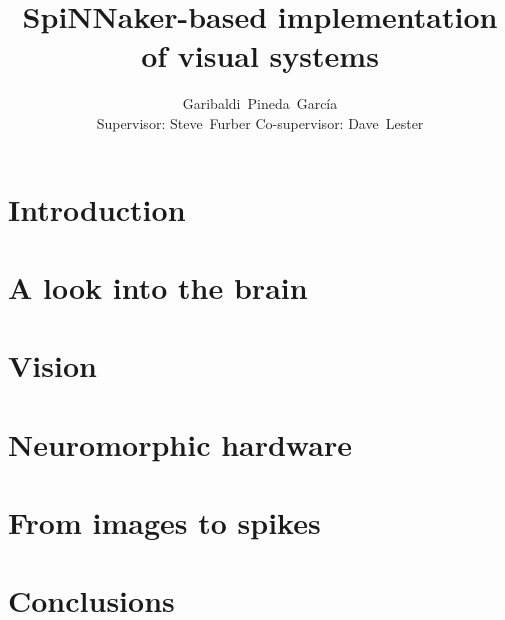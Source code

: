 \documentclass[a4paper]{memoir}
\title{SpiNNaker-based implementation of visual systems}
\author{Garibaldi~Pineda~García \\ Supervisor: Steve~Furber Co-supervisor: Dave~Lester}
\date{}
\begin{document}
  \thispagestyle{empty}
  



  \cleardoublepage
  \tableofcontents
  \cleardoublepage


  \chapter{Introduction}
  
  \label{chp:intro}

  \chapter{A look into the brain}
  \label{chp:brain}
  

  \chapter{Vision}
  \label{chp:vision}
  

  \chapter{Neuromorphic hardware}
  \label{chp:neuro-hw}
  

  \chapter{From images to spikes}
  \label{chp:img2spk}
  

  \chapter{Conclusions}
  \label{chp:conclusions}
  

  
  
\end{document}
